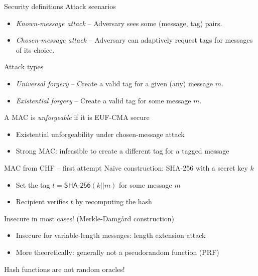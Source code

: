 \begin{frame}{Security definitions}
  Attack scenarios
  \begin{itemize}[<+(1)->]
    \item \emph{Known-message attack} --
    Adversary sees some (message, tag) pairs.
    \item \emph{Chosen-message attack} --
    Adversary can adaptively request tags for messages of its choice.
  \end{itemize}

  \pause
  Attack types
  \begin{itemize}[<+(1)->]
    \item \emph{Universal forgery} --
    Create a valid tag for a given (any) message $m$.
    \item \emph{Existential forgery} --
    Create a valid tag for some message $m$.
  \end{itemize}

  \pause
  A MAC is \emph{unforgeable} if it is EUF-CMA secure
  \begin{itemize}[<+(1)->]
    \item Existential unforgeability under chosen-message attack
    \item Strong MAC: infeasible to create a different tag for a tagged message
  \end{itemize}
\end{frame}

\begin{frame}{MAC from CHF -- first attempt}
  Naive construction: SHA-256 with a secret key $k$
  \begin{itemize}[<+(1)->]
    \item Set the tag $t = \mathsf{SHA\text{-}256}(k||m)$ for some message $m$
    \item Recipient verifies $t$ by recomputing the hash
  \end{itemize}

  \vspace*{1em}

  \pause
  Insecure in most cases! {\scriptsize(Merkle-Damgård construction)}
  \begin{itemize}[<+(1)->]
    \item Insecure for variable-length messages: length extension attack
    \item More theoretically: generally not a pseudorandom function (PRF)
  \end{itemize}

  \vspace*{1em}

  \pause
  Hash functions are not random oracles!
\end{frame}

